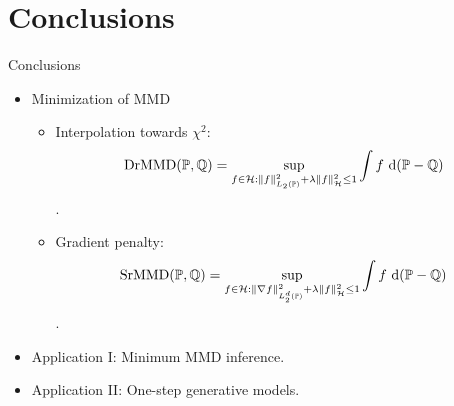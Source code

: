 \documentclass[aspectratio=169,xcolor=dvipsnames]{beamer}
\begin{document}
\section{Conclusions}
\begin{frame}{Conclusions}
\begin{itemize}
    \item Minimization of MMD
    \begin{itemize}
        \item Interpolation towards $\chi^2$: $$\operatorname{DrMMD}(\mathbb{P}, \mathbb{Q})=\sup _{f \in \mathcal{H}:\|f\|_{L_2(\mathbb{P})}^2+\lambda\|f\|_{\mathcal{H}}^2 \leq 1} \int f \mathrm{~d}(\mathbb{P}-\mathbb{Q})$$.
        \item Gradient penalty: $$\operatorname{SrMMD}(\mathbb{P}, \mathbb{Q})=\sup _{f \in \mathcal{H}:\|\nabla f\|_{L_2^d(\mathbb{P})}^2+\lambda\|f\|_{\mathcal{H}}^2 \leq 1} \int f \mathrm{~d}(\mathbb{P}-\mathbb{Q})$$.
    \end{itemize}
    \item Application I: Minimum MMD inference.
    \item Application II: One-step generative models.
\end{itemize}
\end{frame}






\end{document}
